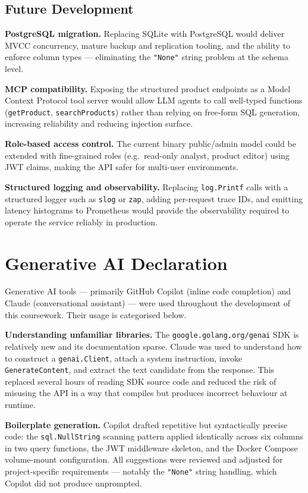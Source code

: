 \documentclass[8pt,a4paper]{article}
\begin{document}
\subsection{Future Development}

\textbf{PostgreSQL migration.} Replacing SQLite with PostgreSQL would deliver MVCC concurrency, mature backup and replication tooling, and the ability to enforce column types — eliminating the \texttt{"None"} string problem at the schema level.

\textbf{MCP compatibility.} Exposing the structured product endpoints as a Model Context Protocol tool server would allow LLM agents to call well-typed functions (\texttt{getProduct}, \texttt{searchProducts}) rather than relying on free-form SQL generation, increasing reliability and reducing injection surface.

\textbf{Role-based access control.} The current binary public/admin model could be extended with fine-grained roles (e.g.\ read-only analyst, product editor) using JWT claims, making the API safer for multi-user environments.

\textbf{Structured logging and observability.} Replacing \texttt{log.Printf} calls with a structured logger such as \texttt{slog} or \texttt{zap}, adding per-request trace IDs, and emitting latency histograms to Prometheus would provide the observability required to operate the service reliably in production.

\section{Generative AI Declaration}

Generative AI tools — primarily GitHub Copilot (inline code completion) and Claude (conversational assistant) — were used throughout the development of this coursework. Their usage is categorised below.

\textbf{Understanding unfamiliar libraries.} The \texttt{google.golang.org/genai} SDK is relatively new and its documentation sparse. Claude was used to understand how to construct a \texttt{genai.Client}, attach a system instruction, invoke \texttt{GenerateContent}, and extract the text candidate from the response. This replaced several hours of reading SDK source code and reduced the risk of misusing the API in a way that compiles but produces incorrect behaviour at runtime.

\textbf{Boilerplate generation.} Copilot drafted repetitive but syntactically precise code: the \texttt{sql.NullString} scanning pattern applied identically across six columns in two query functions, the JWT middleware skeleton, and the Docker Compose volume-mount configuration. All suggestions were reviewed and adjusted for project-specific requirements — notably the \texttt{"None"} string handling, which Copilot did not produce unprompted.
\end{document}
